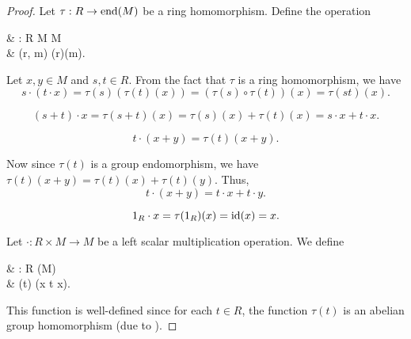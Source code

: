 \begin{proof}
   Let \( \tau: R \to \operatorname{end}(M) \) be a ring homomorphism. Define the operation
  \begin{balign*}
     & \cdot: R \times M \to M           \\
     & \cdot(r, m) \coloneqq \tau(r)(m).
  \end{balign*}

  Let \( x, y \in M \) and \( s, t \in R \). From the fact that \( \tau \) is a ring homomorphism, we have
  \begin{equation*}
    s \cdot (t \cdot x)
    =
    \tau(s)(\tau(t)(x))
    =
    (\tau(s) \circ \tau(t))(x)
    =
    \tau(st)(x).
  \end{equation*}

  \begin{equation*}
    (s + t) \cdot x
    =
    \tau(s + t)(x)
    =
    \tau(s)(x) + \tau(t)(x)
    =
    s \cdot x + t \cdot x.
  \end{equation*}

  \begin{equation*}
    t \cdot (x + y)
    =
    \tau(t)(x + y).
  \end{equation*}

  Now since \( \tau(t) \) is a group endomorphism, we have \( \tau(t)(x + y) = \tau(t)(x) + \tau(t)(y) \). Thus,
  \begin{equation*}
    t \cdot (x + y)
    =
    t \cdot x + t \cdot y.
  \end{equation*}

  \begin{equation*}
    1_R \cdot x
    =
    \tau(1_R)(x)
    =
    \operatorname{id}(x)
    =
    x.
  \end{equation*}

   Let \( \cdot: R \times M \to M \) be a left scalar multiplication operation. We define
  \begin{balign*}
     & \tau: R \to \End(M)                      \\
     & \tau(t) \coloneqq (x \mapsto t \cdot x).
  \end{balign*}

  This function is well-defined since for each \( t \in R \), the function \( \tau(t) \) is an abelian group homomorphism (due to ).


\end{proof}
